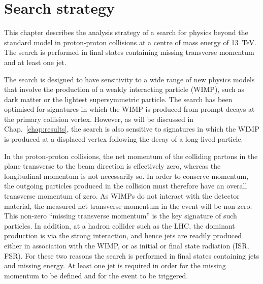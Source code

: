 \chapter{Search strategy}
\label{chap:analysis}

This chapter describes the analysis strategy of a search for physics 
beyond the standard model in proton-proton collisions at a centre of mass 
energy of 13~TeV. The search is performed in final states containing missing 
transverse momentum and at least one jet. 

The search is designed to have sensitivity to a wide range of new physics 
models that involve the production of a weakly interacting 
particle (WIMP), such as dark matter or the lightest supersymmetric particle. 
The search has been optimised for signatures in which the WIMP is produced from 
prompt decays at the primary collision vertex. However, as will be discussed in 
Chap.~\ref{chap:results}, the search is also sensitive to signatures in which 
the WIMP is produced at a displaced vertex following the decay of a long-lived 
particle. %

In the proton-proton collisions, the net momentum of the colliding partons in 
the plane transverse to the beam direction is effectively zero, whereas the 
longitudinal momentum is not necessarily so. In order to conserve momentum, the 
outgoing particles produced in the collision must therefore have an overall 
transverse momentum of zero. As WIMPs do not interact with the detector 
material, the measured net transverse momentum in the event will be non-zero. 
This non-zero ``missing transverse momentum'' is the key signature of such 
particles. In addition, at a hadron collider such as the LHC, the dominant 
production is via the strong interaction, and hence jets are readily produced 
either in association with the WIMP, or as initial or final state radiation 
(ISR, FSR). For these two reasons the search is performed in final states 
containing jets and missing energy. At least one jet is required in order for 
the missing momentum to be defined and for the event to be triggered.

